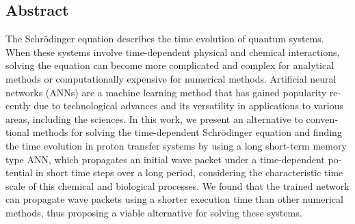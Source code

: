 \begin{otherlanguage}{english}
  \chapter*{Abstract}
  \small
  The Schrödinger equation describes the time evolution of quantum systems. When these systems involve time-dependent physical and chemical interactions, solving the equation can become more complicated and complex for analytical methods or computationally expensive for numerical methods. Artificial neural networks (\acs{ANN}s) are a machine learning method that has gained popularity recently due to technological advances and its versatility in applications to various areas, including the sciences. In this work, we present an alternative to conventional methods for solving the time-dependent Schrödinger equation and finding the time evolution in proton transfer systems by using a long short-term memory type \acs{ANN}, which propagates an initial wave packet under a time-dependent potential in short time steps over a long period, considering the characteristic time scale of this chemical and biological processes. We found that the trained network can propagate wave packets using a shorter execution time than other numerical methods, thus proposing a viable alternative for solving these systems.


\end{otherlanguage}

\endgroup

\vfill
